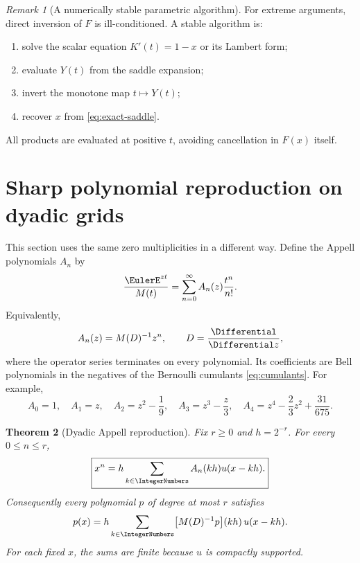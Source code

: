 \documentclass[11pt,oneside]{article}
\newtheorem{theorem}{Theorem}[section]
\theoremstyle{definition}
\theoremstyle{remark}
\newtheorem{remark}[theorem]{Remark}
\begin{document}
\begin{remark}[A numerically stable parametric algorithm]
For extreme arguments, direct inversion of \(F\) is ill-conditioned.
A stable algorithm is:
\begin{enumerate}[label=\arabic*.,leftmargin=2em]
\item solve the scalar equation \(K'(t)=1-x\) or its Lambert form;
\item evaluate \(Y(t)\) from the saddle expansion;
\item invert the monotone map \(t\mapsto Y(t)\);
\item recover \(x\) from \eqref{eq:exact-saddle}.
\end{enumerate}
All products are evaluated at positive \(t\), avoiding cancellation in
\(F(x)\) itself.
\end{remark}

\section{Sharp polynomial reproduction on dyadic grids}

This section uses the same zero multiplicities in a different way.  Define
the Appell polynomials \(A_n\) by
\begin{equation}
 \frac{\EulerE^{zt}}{M(t)}
 =\sum_{n=0}^{\infty}A_n(z)\frac{t^n}{n!}.
 \label{eq:Appell}
\end{equation}
Equivalently,
\begin{equation}
 A_n(z)=M(D)^{-1}z^n,\qquad D=\frac{\Differential}{\Differential z},
 \label{eq:Appell-operator}
\end{equation}
where the operator series terminates on every polynomial.  Its coefficients
are Bell polynomials in the negatives of the Bernoulli cumulants
\eqref{eq:cumulants}.  For example,
\[
 A_0=1,\quad A_1=z,\quad
 A_2=z^2-\frac19,\quad
 A_3=z^3-\frac z3,\quad
 A_4=z^4-\frac23z^2+\frac{31}{675}.
\]

\begin{theorem}[Dyadic Appell reproduction]
\label{thm:reproduction}
Fix \(r\geq0\) and \(h=2^{-r}\).  For every \(0\leq n\leq r\),
\begin{equation}
 \boxed{\displaystyle
 x^n=h\sum_{k\in\IntegerNumbers}A_n(kh)u(x-kh).}
 \label{eq:monomial-reproduction}
\end{equation}
Consequently every polynomial \(p\) of degree at most \(r\) satisfies
\begin{equation}
 p(x)
 =h\sum_{k\in\IntegerNumbers}
 \bigl[M(D)^{-1}p\bigr](kh)\,u(x-kh).
 \label{eq:poly-reproduction}
\end{equation}
For each fixed \(x\), the sums are finite because \(u\) is compactly
supported.
\end{theorem}
\end{document}
